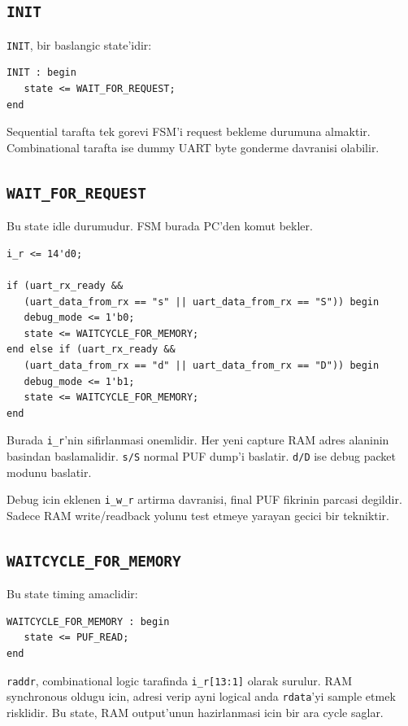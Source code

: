 \documentclass[11pt,a4paper]{article}
\begin{document}
\subsection{\texttt{INIT}}
\texttt{INIT}, bir baslangic state'idir:
\begin{lstlisting}[style=verilogstyle]
INIT : begin
   state <= WAIT_FOR_REQUEST;
end
\end{lstlisting}

Sequential tarafta tek gorevi FSM'i request bekleme durumuna almaktir. Combinational tarafta ise dummy UART byte gonderme davranisi olabilir.

\subsection{\texttt{WAIT\_FOR\_REQUEST}}
Bu state idle durumudur. FSM burada PC'den komut bekler.

\begin{lstlisting}[style=verilogstyle]
i_r <= 14'd0;

if (uart_rx_ready &&
   (uart_data_from_rx == "s" || uart_data_from_rx == "S")) begin
   debug_mode <= 1'b0;
   state <= WAITCYCLE_FOR_MEMORY;
end else if (uart_rx_ready &&
   (uart_data_from_rx == "d" || uart_data_from_rx == "D")) begin
   debug_mode <= 1'b1;
   state <= WAITCYCLE_FOR_MEMORY;
end
\end{lstlisting}

Burada \texttt{i\_r}'nin sifirlanmasi onemlidir. Her yeni capture RAM adres alaninin basindan baslamalidir. \texttt{s/S} normal PUF dump'i baslatir. \texttt{d/D} ise debug packet modunu baslatir.

Debug icin eklenen \texttt{i\_w\_r} artirma davranisi, final PUF fikrinin parcasi degildir. Sadece RAM write/readback yolunu test etmeye yarayan gecici bir tekniktir.

\subsection{\texttt{WAITCYCLE\_FOR\_MEMORY}}
Bu state timing amaclidir:
\begin{lstlisting}[style=verilogstyle]
WAITCYCLE_FOR_MEMORY : begin
   state <= PUF_READ;
end
\end{lstlisting}

\texttt{raddr}, combinational logic tarafinda \texttt{i\_r[13:1]} olarak surulur. RAM synchronous oldugu icin, adresi verip ayni logical anda \texttt{rdata}'yi sample etmek risklidir. Bu state, RAM output'unun hazirlanmasi icin bir ara cycle saglar.
\end{document}
